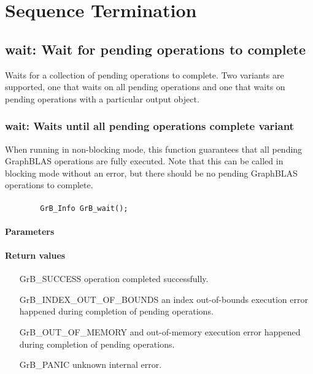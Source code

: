 \section{Sequence Termination}

\subsection{{\sf wait}: Wait for pending operations to complete}

Waits for a collection of pending operations to complete. Two variants are supported, one that
waits on all pending operations and one that waits on pending operations with a particular output object.

\subsubsection{{\sf wait}: Waits until all pending operations complete variant}
\label{Sec:GrB_wait}

When running in non-blocking mode, this function guarantees that all pending GraphBLAS operations are fully executed.  Note that this can be called in blocking mode without an error, but there should be no pending GraphBLAS operations to complete.

\paragraph{\syntax}

\begin{verbatim}
        GrB_Info GrB_wait();
\end{verbatim}

\paragraph{Parameters}

\paragraph{Return values}

\begin{itemize}[leftmargin=2.3in]
	\item[{\sf GrB\_SUCCESS}]	operation completed successfully.
	\item[{\sf GrB\_INDEX\_OUT\_OF\_BOUNDS}]	an index out-of-bounds execution error happened during completion of pending operations.
	\item[{\sf GrB\_OUT\_OF\_MEMORY}]		and out-of-memory execution error happened during completion of pending operations.
	\item[{\sf GrB\_PANIC}]		unknown internal error.
\end{itemize}

